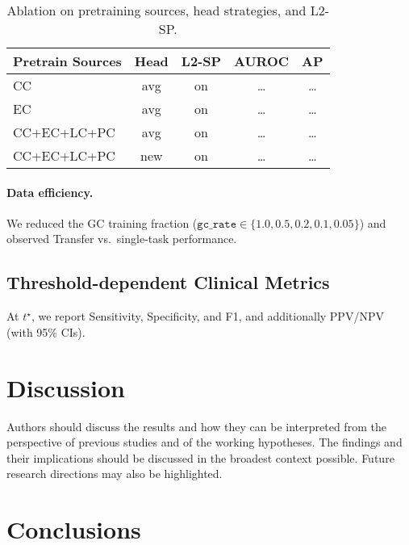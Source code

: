 \documentclass[diagnostics,article,submit,pdftex,moreauthors]{Definitions/mdpi}
\begin{document}
\begin{table}[H]
\caption{Ablation on pretraining sources, head strategies, and L2-SP.}
\label{tab:ablation}
\centering
\begin{tabular}{lcccc}
\toprule
Pretrain Sources & Head & L2-SP & AUROC & AP \\
\midrule
CC & avg & on & \dots & \dots \\
EC & avg & on & \dots & \dots \\
CC+EC+LC+PC & avg & on & \dots & \dots \\
CC+EC+LC+PC & new & on & \dots & \dots \\
\bottomrule
\end{tabular}
\end{table}

\paragraph{Data efficiency.}
We reduced the GC training fraction ($\texttt{gc\_rate}\in\{1.0,0.5,0.2,0.1,0.05\}$) and observed Transfer vs.\ single-task performance. %

\subsection{Threshold-dependent Clinical Metrics}
At $t^\star$, we report Sensitivity, Specificity, and F1, and additionally PPV/NPV (with 95\% CIs).


\section{Discussion}

Authors should discuss the results and how they can be interpreted from the perspective of previous studies and of the working hypotheses. The findings and their implications should be discussed in the broadest context possible. Future research directions may also be highlighted.

\section{Conclusions}
\end{document}
